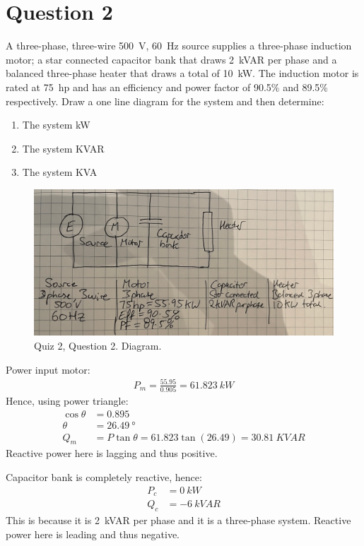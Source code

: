 \section{Question 2}
A three-phase, three-wire \SI{500}{\volt}, \SI{60}{\hertz} source supplies a three-phase induction motor; a star connected capacitor bank that draws \SI{2}{kVAR} per phase and a balanced three-phase heater that draws a total of \SI{10}{\kilo\watt}. The induction motor is rated at \SI{75}{hp} and has an efficiency and power factor of 90.5\% and 89.5\% respectively. Draw a one line diagram for the system and then determine:
\begin{enumerate}
    \item The system kW
    \item The system KVAR
    \item The system KVA
\end{enumerate}
\begin{figure}[H]
    \centering
    \includegraphics[width = \textwidth]{img/figure151.jpg}
    \caption{Quiz 2, Question 2. Diagram.}
\end{figure}
Power input motor:
\begin{gather}
    P_{m} = \frac{55.95}{0.905} = \SI{61.823}{kW}
\end{gather}
Hence, using power triangle:
\begin{align}
    \cos\theta &= 0.895\\
    \theta &= \SI{26.49}{\degree}\\
    Q_{m} &= P\tan\theta = 61.823\tan\left(26.49\right) = \SI{30.81}{KVAR}
\end{align}
Reactive power here is lagging and thus positive.

Capacitor bank is completely reactive, hence:
\begin{align}
    P_{c} & = \SI{0}{kW}    \\
    Q_{c} & = \SI{-6}{kVAR}
\end{align}
This is because it is \SI{2}{kVAR} per phase and it is a three-phase system. Reactive power here is leading and thus negative.

